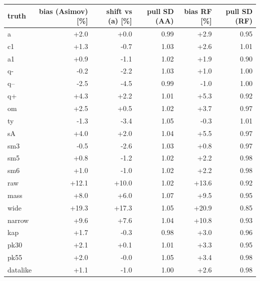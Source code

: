 \begin{tabular}{lrrrrr}
\hline
 truth & bias (Asimov) [\%] & shift vs (a) [\%] & pull SD (AA) & bias RF [\%] & pull SD (RF) \\
\hline
 a & +2.0 & +0.0 & 0.99 & +2.9 & 0.95 \\
 c1 & +1.3 & -0.7 & 1.03 & +2.6 & 1.01 \\
 a1 & +0.9 & -1.1 & 1.02 & +1.9 & 0.90 \\
 q- & -0.2 & -2.2 & 1.03 & +1.0 & 1.00 \\
 q-- & -2.5 & -4.5 & 0.99 & -1.0 & 1.00 \\
 q+ & +4.3 & +2.2 & 1.01 & +5.3 & 0.92 \\
 om & +2.5 & +0.5 & 1.02 & +3.7 & 0.97 \\
 ty & -1.3 & -3.4 & 1.05 & -0.3 & 1.01 \\
 sA & +4.0 & +2.0 & 1.04 & +5.5 & 0.97 \\
 sm3 & -0.5 & -2.6 & 1.03 & +0.8 & 0.97 \\
 sm5 & +0.8 & -1.2 & 1.02 & +2.2 & 0.98 \\
 sm6 & +1.0 & -1.0 & 1.02 & +2.2 & 0.98 \\
 raw & +12.1 & +10.0 & 1.02 & +13.6 & 0.92 \\
 mass & +8.0 & +6.0 & 1.07 & +9.5 & 0.95 \\
 wide & +19.3 & +17.3 & 1.05 & +20.9 & 0.85 \\
 narrow & +9.6 & +7.6 & 1.04 & +10.8 & 0.93 \\
 kap & +1.7 & -0.3 & 0.98 & +3.0 & 0.96 \\
 pk30 & +2.1 & +0.1 & 1.01 & +3.3 & 0.95 \\
 pk55 & +2.0 & -0.0 & 1.05 & +3.4 & 0.98 \\
 datalike & +1.1 & -1.0 & 1.00 & +2.6 & 0.98 \\
\hline
\end{tabular}
